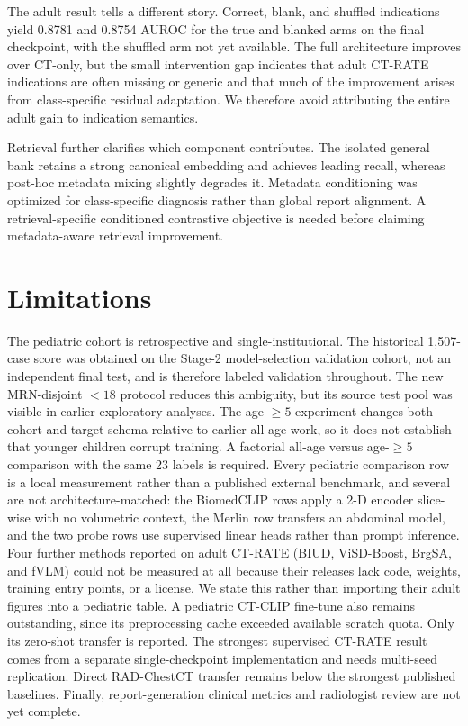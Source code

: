 \documentclass[10pt,twocolumn]{article}
\begin{document}
The adult result tells a different story. Correct, blank, and shuffled
indications yield 0.8781 and 0.8754 AUROC for the true and blanked arms on the
final checkpoint, with the shuffled arm not yet available. The full
architecture improves over CT-only, but the small intervention gap indicates
that adult CT-RATE indications are often missing or generic and that much of
the improvement arises from class-specific residual adaptation. We therefore
avoid attributing the entire adult gain to indication semantics.

Retrieval further clarifies which component contributes. The isolated general
bank retains a strong canonical embedding and achieves leading recall, whereas
post-hoc metadata mixing slightly degrades it. Metadata conditioning was
optimized for class-specific diagnosis rather than global report alignment. A
retrieval-specific conditioned contrastive objective is needed before claiming
metadata-aware retrieval improvement.

\section{Limitations}
The pediatric cohort is retrospective and single-institutional. The historical
1,507-case score was obtained on the Stage-2 model-selection validation cohort,
not an independent final test, and is therefore labeled validation throughout.
The new MRN-disjoint $<18$ protocol reduces this ambiguity, but its source test
pool was visible in earlier exploratory analyses. The age-$\geq5$
experiment changes both cohort and target schema relative to earlier all-age
work, so it does not establish that younger children corrupt training. A
factorial all-age versus age-$\geq5$ comparison with the same 23 labels is
required. Every pediatric comparison row is a local measurement rather than a
published external benchmark, and several are not architecture-matched: the
BiomedCLIP rows apply a 2-D encoder slice-wise with no volumetric context, the
Merlin row transfers an abdominal model, and the two probe rows use supervised
linear heads rather than prompt inference. Four further methods reported on
adult CT-RATE (BIUD, ViSD-Boost, BrgSA, and fVLM) could not be measured at all
because their releases lack code, weights, training entry points, or a
license. We state this rather than importing their adult figures into a
pediatric table. A pediatric CT-CLIP fine-tune also remains outstanding, since
its preprocessing cache exceeded available scratch quota. Only its zero-shot
transfer is reported. The strongest supervised CT-RATE result
comes from a separate single-checkpoint implementation and needs multi-seed
replication. Direct RAD-ChestCT transfer remains below the strongest published
baselines. Finally, report-generation clinical metrics and radiologist review
are not yet complete.
\end{document}
